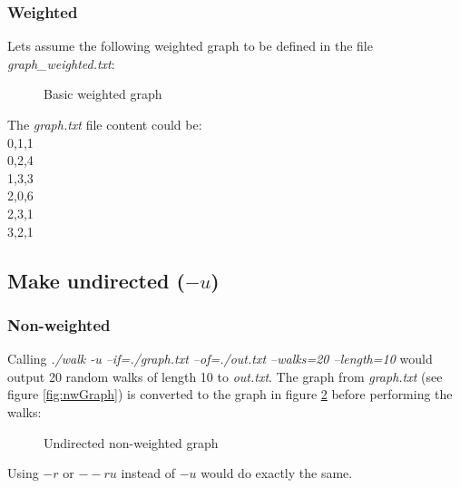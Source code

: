 \documentclass[12pt,a4paper]{article}
\begin{document}
		\subsubsection{Weighted}
			Lets assume the following weighted graph to be defined in the file \textit{graph\_weighted.txt}:
			\begin{figure}[H]
				\centering
				\caption{Basic weighted graph} \label{fig:wGraph}
			\end{figure}
			The \textit{graph.txt} file content could be:\\
			0,1,1\\0,2,4\\1,3,3\\2,0,6\\2,3,1\\3,2,1
	\subsection{Make undirected ($-u$)}
		\subsubsection{Non-weighted}
			Calling \textit{./walk -u --if=./graph.txt --of=./out.txt --walks=20 --length=10} would output 20 random walks of length 10 to \textit{out.txt}. The graph from \textit{graph.txt} (see figure \ref{fig:nwGraph}) is converted to the graph in figure \ref{fig:unwGraph} before performing the walks:
			\begin{figure}[H]
				\centering
				\caption{Undirected non-weighted graph} \label{fig:unwGraph}		
			\end{figure}
			Using $-r$ or $--ru$ instead of $-u$ would do exactly the same.
\end{document}
